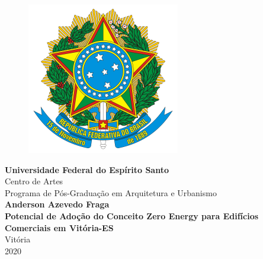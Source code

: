 \begin{titlepage}
    \begin{center}
        \thispagestyle{empty}
        \begin{figure}
		\centering
		\includegraphics[scale=1.15]{figures/brasao-rep-br.png}
        \end{figure}
        \vspace*{0.1cm}
        \textbf{\large Universidade Federal do Espírito Santo}\\
        \large Centro de Artes\\
        \large Programa de Pós-Graduação em Arquitetura e Urbanismo\\
        \vspace*{3cm}
        \textbf{\large Anderson Azevedo Fraga}\\
        \vspace*{4cm}
        \textbf{Potencial de Adoção do Conceito Zero Energy para Edifícios Comerciais em Vitória-ES}\\
        \vfill %
        Vitória\\
        2020\pagebreak


\end{center}
\end{titlepage}
